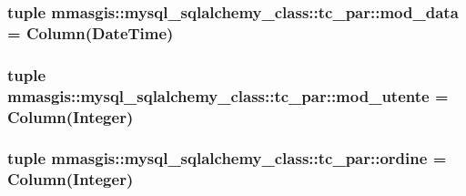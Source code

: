 \label{classmmasgis_1_1mysql__sqlalchemy__class_1_1tc__par_af374fac8a68cc4836c83134fb122dd6a}
\hypertarget{classmmasgis_1_1mysql__sqlalchemy__class_1_1tc__par_a8e994c079cf7097acc8c6346de974c4e}{
\subsubsection[{mod\_\-data}]{\setlength{\rightskip}{0pt plus 5cm}tuple {\bf mmasgis::mysql\_\-sqlalchemy\_\-class::tc\_\-par::mod\_\-data} = Column(DateTime)}}
\label{classmmasgis_1_1mysql__sqlalchemy__class_1_1tc__par_a8e994c079cf7097acc8c6346de974c4e}
\hypertarget{classmmasgis_1_1mysql__sqlalchemy__class_1_1tc__par_a78f9cd94837ce65f496c6942642cc0f6}{
\subsubsection[{mod\_\-utente}]{\setlength{\rightskip}{0pt plus 5cm}tuple {\bf mmasgis::mysql\_\-sqlalchemy\_\-class::tc\_\-par::mod\_\-utente} = Column(Integer)}}
\label{classmmasgis_1_1mysql__sqlalchemy__class_1_1tc__par_a78f9cd94837ce65f496c6942642cc0f6}
\hypertarget{classmmasgis_1_1mysql__sqlalchemy__class_1_1tc__par_a512c07674ee91592baf169c5fabaf314}{
\subsubsection[{ordine}]{\setlength{\rightskip}{0pt plus 5cm}tuple {\bf mmasgis::mysql\_\-sqlalchemy\_\-class::tc\_\-par::ordine} = Column(Integer)}}
\label{classmmasgis_1_1mysql__sqlalchemy__class_1_1tc__par_a512c07674ee91592baf169c5fabaf314}
